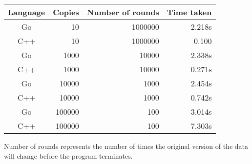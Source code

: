 \documentclass[11pt]{article}
\begin{document}
\begin{tabular}{c r r r}
Language    & Copies & Number of rounds & Time taken \\
\toprule
Go 			& 10 & 1000000 & 2.218s \\
C++         & 10 & 1000000 & 0.100 \\
\cmidrule{1-4}
Go 			& 1000 & 10000 & 2.338s \\
C++         & 1000 & 10000 & 0.271s \\
\cmidrule{1-4}
Go 			& 10000 & 1000 & 2.454s \\
C++         & 10000 & 1000 & 0.742s \\
\cmidrule{1-4}
Go 			& 100000 & 100 & 3.014s \\
C++         & 100000 & 100 & 7.303s \\
\end{tabular}
\newline
Number of rounds represents the number of times the original version of the data will change before the program terminates.
\pagebreak
\end{document}
